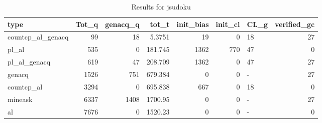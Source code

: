 \begin{table}[ht]
\caption{Results for jsudoku}
\begin{tabular}{lrrrrrlr}
\hline
 type              &   Tot\_q &   genacq\_q &     tot\_t &   init\_bias &   init\_cl & CL\_g   &   verified\_gc \\
\hline
 countcp\_al\_genacq &      99 &         18 &    5.3751 &          19 &         0 & 18     &            27 \\
 pl\_al             &     535 &          0 &  181.745  &        1362 &       770 & 47     &             0 \\
 pl\_al\_genacq      &     619 &         47 &  208.709  &        1362 &         0 & 47     &            27 \\
 genacq            &    1526 &        751 &  679.384  &           0 &         0 & -      &            27 \\
 countcp\_al        &    3294 &          0 &  695.838  &         667 &         0 & 18     &             0 \\
 mineask           &    6337 &       1408 & 1700.95   &           0 &         0 & -      &            27 \\
 al                &    7676 &          0 & 1520.23   &           0 &         0 & -      &             0 \\
\hline
\end{tabular}
\end{table}